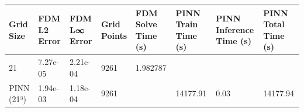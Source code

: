 \begin{tabular}{llllllll}
\toprule
Grid Size & FDM L2 Error & FDM L∞ Error & Grid Points & FDM Solve Time (s) & PINN Train Time (s) & PINN Inference Time (s) & PINN Total Time (s) \\
\midrule
21 & 7.27e-05 & 2.21e-04 & 9261 & 1.982787 &  &  &  \\
PINN (21³) & 1.94e-03 & 1.18e-04 & 9261 &  & 14177.91 & 0.03 & 14177.94 \\
\bottomrule
\end{tabular}
